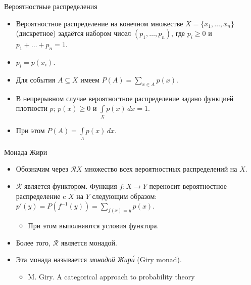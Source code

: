 \documentclass[xcolor=dvipsnames]{beamer}
\newcommand{\Rc}{\mathcal{R}}
\begin{document}
\begin{frame}{Вероятностные распределения}
 
 \begin{itemize}[<+->]
  \item Вероятностное распределение на конечном множестве $X = \{ x_1, \ldots, x_n \}$ (дискретное) задаётся набором чисел $(p_1, \ldots, p_n)$, где $p_i \geqslant 0$ и $p_1 + \ldots + p_n = 1$.
  \item $p_i = p(x_i)$.
  \item Для события $A \subseteq X$ имеем $P(A) = \sum\limits_{x\in A} p(x)$.
  \item В непрерывном случае вероятностное распределение задано функцией плотности $p$; $p(x) \geqslant 0$ и $\int\limits_X p(x) \, dx = 1$.
  \item При этом $P(A) = \int\limits_A p(x)\, dx$.
 \end{itemize}

 
\end{frame}

\begin{frame}{Монада Жири}
 
 \begin{itemize}[<+->]
  \item Обозначим через $\Rc X$ множество всех вероятностных распределений на $X$.
  \item $\Rc$ является функтором. Функция $f \colon X \to Y$ переносит вероятностное распределение c $X$ на $Y$ следующим образом: $p'(y) = P(f^{-1}(y)) = \sum\limits_{f(x) = y} p(x)$.
  \begin{itemize}
  \item При этом выполняются условия функтора.
  \end{itemize}
  \item Более того, $\Rc$ является монадой.
  \item Эта монада называется {\em монадой Жир\'{и}} (Giry monad).
  \begin{itemize}
  \item M. Giry. A categorical approach to probability theory
  \end{itemize}
 \end{itemize}

 
\end{frame}
\end{document}
